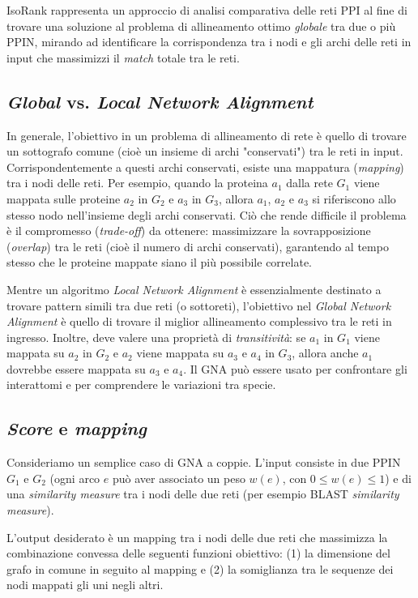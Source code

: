 \documentclass[11pt]{article}
\begin{document}
IsoRank rappresenta un approccio di analisi comparativa delle reti PPI al fine di trovare una soluzione al problema di allineamento ottimo \textit{globale} tra due o più PPIN, mirando ad identificare la corrispondenza tra i nodi e gli archi delle reti in input che massimizzi il \textit{match} totale tra le reti.

\subsection{\textit{Global} vs. \textit{Local Network Alignment}}
In generale, l'obiettivo in un problema di allineamento di rete è quello di trovare un sottografo comune (cioè un insieme di archi "conservati") tra le reti in input. Corrispondentemente a questi archi conservati, esiste una mappatura (\textit{mapping}) tra i nodi delle reti. Per esempio, quando la proteina $a_1$ dalla rete $G_1$ viene mappata sulle proteine $a_2$ in $G_2$ e $a_3$ in $G_3$, allora $a_1$, $a_2$ e $a_3$ si riferiscono allo stesso nodo nell'insieme degli archi conservati. Ciò che rende difficile il problema è il compromesso (\textit{trade-off}) da ottenere: massimizzare la sovrapposizione (\textit{overlap}) tra le reti (cioè il numero di archi conservati), garantendo al tempo stesso che le proteine mappate siano il più possibile correlate.

Mentre un algoritmo \textit{Local Network Alignment} è essenzialmente destinato a trovare pattern simili tra due reti (o sottoreti), l'obiettivo nel \textit{Global Network Alignment} è quello di trovare il miglior allineamento complessivo tra le reti in ingresso.
Inoltre, deve valere una proprietà di \textit{transitività}: se $a_1$ in $G_1$ viene mappata su $a_2$ in $G_2$ e $a_2$ viene mappata su $a_3$ e $a_4$ in $G_3$, allora anche $a_1$ dovrebbe essere mappata su $a_3$ e $a_4$. Il GNA può essere usato per confrontare gli interattomi e per comprendere le variazioni tra specie.

\subsection{\textit{Score} e \textit{mapping}}
Consideriamo un semplice caso di GNA a coppie. L'input consiste in due PPIN $G_1$ e $G_2$ (ogni arco $e$ può aver associato un peso $w(e)$, con $0\leq w(e) \leq1$) e di una \textit{similarity measure} tra i nodi delle due reti (per esempio BLAST \textit{similarity measure}).

L'output desiderato è un mapping tra i nodi delle due reti che massimizza la combinazione convessa delle seguenti funzioni obiettivo: (1) la dimensione del grafo in comune in seguito al mapping e (2) la somiglianza tra le sequenze dei nodi mappati gli uni negli altri.
\end{document}
